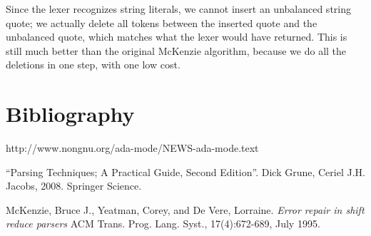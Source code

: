 \documentclass{article}
\begin{document}
Since the lexer recognizes string literals, we cannot insert an
unbalanced string quote; we actually delete all tokens between the
inserted quote and the unbalanced quote, which matches what the lexer
would have returned. This is still much better than the original
McKenzie algorithm, because we do all the deletions in one step, with
one low cost.




\section{Bibliography}
\begin{thebibliography}{9}

 http://www.nongnu.org/ada-mode/NEWS-ada-mode.text

 ``Parsing Techniques; A Practical Guide, Second
  Edition''. Dick Grune, Ceriel J.H. Jacobs, 2008. Springer Science.

 McKenzie, Bruce J., Yeatman, Corey, and De
  Vere, Lorraine.
  \textit{Error repair in shift reduce parsers} ACM Trans. Prog.
  Lang. Syst., 17(4):672-689, July 1995.
\end{thebibliography}
\end{document}

